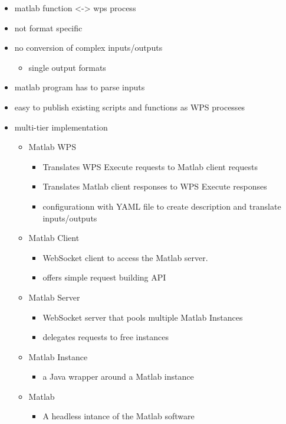 	\begin{itemize}
		\item matlab function <-> wps process
		\item not format specific
		\item no conversion of complex inputs/outputs
		\begin{itemize}
			\item single output formats
		\end{itemize}
		\item matlab program has to parse inputs
		\item easy to publish existing scripts and functions as WPS processes
		\item multi-tier implementation
		\begin{itemize}
			\item Matlab WPS
			\begin{itemize}
				\item Translates WPS Execute requests to Matlab client requests
				\item Translates Matlab client responses to WPS Execute responses
				\item configurationn with YAML file to create description and translate inputs/outputs
			\end{itemize}
			\item Matlab Client
			\begin{itemize}
				\item WebSocket client to access the Matlab server.
				\item offers simple request building API
			\end{itemize}
			\item Matlab Server
			\begin{itemize}
				\item WebSocket server that pools multiple Matlab Instances
				\item delegates requests to free instances
			\end{itemize}
			\item Matlab Instance
			\begin{itemize}
				\item a Java wrapper around a Matlab instance
			\end{itemize}
			\item Matlab
			\begin{itemize}
				\item A headless intance of the Matlab software
			\end{itemize}
		\end{itemize}
	\end{itemize}
